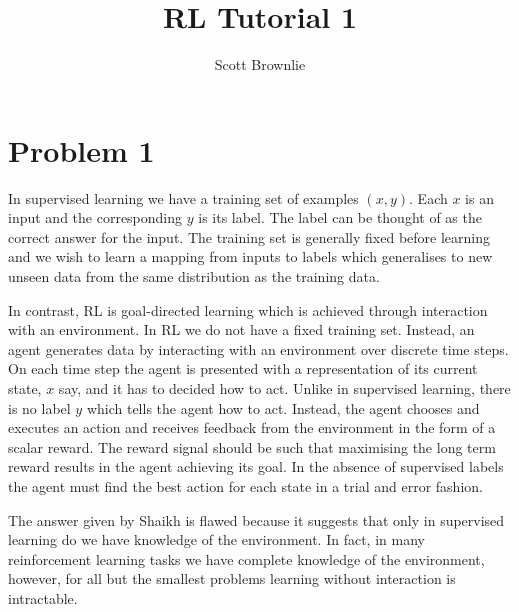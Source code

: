 \documentclass[a4paper,11pt]{article}
\title{RL Tutorial 1}
\author{Scott Brownlie}
\date{}
\numberwithin{equation}{section}
\theoremstyle{remark}
\begin{document}
\maketitle

\section*{Problem 1}

In supervised learning we have a training set of examples $(x, y)$. Each $x$ is an input and the corresponding $y$ is its label. The label can be thought of as the correct answer for the input. The training set is generally fixed before learning and we wish to learn a mapping from inputs to labels which generalises to new unseen data from the same distribution as the training data. 

In contrast, RL is goal-directed learning which is achieved through interaction with an environment. In RL we do not have a fixed training set. Instead, an agent generates data by interacting with an environment over discrete time steps. On each time step the agent is presented with a representation of its current state, $x$ say, and it has to decided how to act. Unlike in supervised learning, there is no label $y$ which tells the agent how to act. Instead, the agent chooses and executes an action and receives feedback from the environment in the form of a scalar reward. The reward signal should be such that maximising the long term reward results in the agent achieving its goal. In the absence of supervised labels the agent must find the best action for each state in a trial and error fashion.

The answer given by Shaikh is flawed because it suggests that only in supervised learning do we have knowledge of the environment. In fact, in many reinforcement learning tasks we have complete knowledge of the environment, however, for all but the smallest problems learning without interaction is intractable.  
\end{document}
